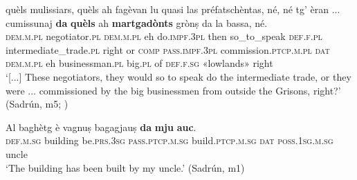 \ea
\label{ex:pass.dyn7}
\gll [...] quèls mulissiars, quèls ah fagèvan lu quasi las préfatschèntas, né, né tg’ èran ... cumissunaj \textbf{da} \textbf{quèls} ah \textbf{martgadònts} grònṣ da la bassa, né.\\
{} \textsc{dem.m.pl} negotiator.\textsc{pl} \textsc{dem.m.pl} eh do.\textsc{impf.3pl} then so\_to\_speak \textsc{def.f.pl}  intermediate\_trade.\textsc{pl} right or \textsc{comp} \textsc{pass.impf.3pl} {} commission.\textsc{ptcp.m.pl} \textsc{dat} \textsc{dem.m.pl} eh businessman.\textsc{pl} big.\textsc{pl} of \textsc{def.f.sg} «lowlands» right \\
\glt `[...] These negotiators, they would so to speak do the intermediate trade, or they were ... commissioned by the big businessmen from outside the Grisons, right?' (Sadrún, m5; )
\z

\ea
\label{ex:pass.dyn8}
\gll Al baghètg è vagnuṣ bagagjauṣ \textbf{da} \textbf{mju} \textbf{auc}.\\
\textsc{def.m.sg} building be.\textsc{prs.3sg} \textsc{pass.ptcp.m.sg} build.\textsc{ptcp.m.sg} \textsc{dat} \textsc{poss.1sg.m.sg} uncle\\
\glt `The building has been built by my uncle.' (Sadrún, m1)
\z
